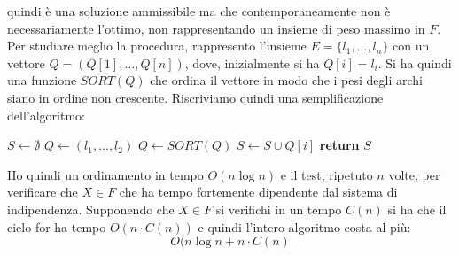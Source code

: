 \documentclass[a4paper,12pt, oneside]{book}
\begin{document}
quindi è una soluzione ammissibile ma che contemporaneamente non è
necessariamente l'ottimo, non rappresentando un insieme di peso
massimo in $F$.\\
Per studiare meglio la procedura, rappresento l'insieme
$E=\{l_1,\ldots,l_n\}$ con un vettore $Q=(Q[1],\ldots,Q[n])$, dove,
inizialmente si ha $Q[i]=l_i$. Si ha quindi una funzione $SORT(Q)$
che ordina il vettore in modo che i pesi degli archi siano in ordine
non crescente. Riscriviamo quindi una semplificazione dell'algoritmo:
\begin{algorithm}[H]
  \begin{algorithmic}
    \State $S\gets \emptyset$
    \State $Q\gets (l_1,\ldots,l_2)$
    \State $Q\gets SORT(Q)$
    \State $S\gets S\cup Q[i]$
    \EndIf
    \EndFor
    \State \textbf{return} $S$
    \EndFunction
  \end{algorithmic}
\end{algorithm}
Ho quindi un ordinamento in tempo $O(n\log n)$ e il test, ripetuto $n$
volte, per verificare che $X\in F$ che ha tempo fortemente dipendente
dal sistema di indipendenza. Supponendo che $X\in F$ si verifichi in
un tempo $C(n)$ si ha che il ciclo for ha tempo $O(n\cdot C(n))$ e
quindi l'intero algoritmo costa al più:
\[O(n\log n+n\cdot C(n)\]
\end{document}
